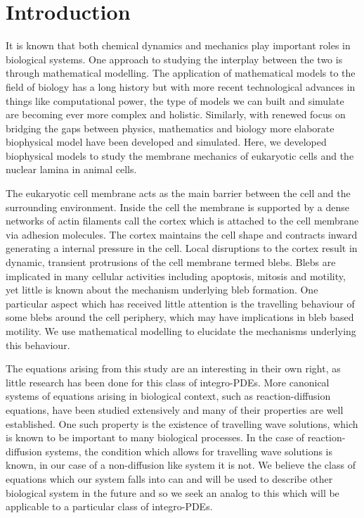 \chapter{Introduction}

It is known that both chemical dynamics and mechanics play important roles in biological systems. One approach to studying the interplay between the two is through mathematical modelling. The application of mathematical models to the field of biology has a long history but with more recent technological advances in things like computational power, the type of models we can built and simulate are becoming ever more complex and holistic.  Similarly, with renewed focus on bridging the gaps between physics, mathematics and biology more elaborate biophysical model have been developed and simulated. Here, we developed biophysical models to study the membrane mechanics of eukaryotic cells and the nuclear lamina in animal cells. 

The eukaryotic cell membrane acts as the main barrier between the cell and the surrounding environment. Inside the cell the membrane is supported by a dense networks of actin filaments call the cortex which is attached to the cell membrane via adhesion molecules. The cortex maintains the cell shape and contracts inward generating a internal pressure in the cell. Local disruptions to the cortex result in dynamic, transient protrusions of the cell membrane termed blebs. Blebs are implicated in many cellular activities including apoptosis, mitosis and motility, yet little is known about the mechanism underlying bleb formation. One particular aspect which has received little attention is the travelling behaviour of some blebs around the cell periphery, which may have implications in bleb based motility. We use mathematical modelling to elucidate the mechanisms underlying this behaviour. 

The equations arising from this study are an interesting in their own right, as little research has been done for this class of integro-PDEs. More canonical systems of equations arising in biological context, such as reaction-diffusion equations, have been studied extensively and many of their properties are well established. One such property is the existence of travelling wave solutions, which is known to be important to many biological processes. In the case of reaction-diffusion systems, the condition which allows for travelling wave solutions is known, in our case of a non-diffusion like system it is not. We believe the class of equations which our system falls into can and will be used to describe other biological system in the future and so we seek an analog to this which will be applicable to a particular class of integro-PDEs. 

